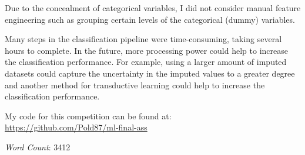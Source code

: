 \documentclass[a4paper,11pt]{article}
\begin{document}
Due to the concealment of categorical variables, I did not consider
manual feature engineering such as grouping certain levels of the
categorical (dummy) variables.

Many steps in the classification pipeline were time-consuming, taking
several hours to complete. In the future, more processing power could
help to increase the classification performance. For example, using a
larger amount of imputed datasets could capture the uncertainty in the
imputed values to a greater degree and another method for
transductive learning could help to increase the classification performance.

My code for this competition can be found at:\\
\url{https://github.com/Pold87/ml-final-ass}

\emph{Word Count}: 3412
\clearpage
\printbibliography
\end{document}
